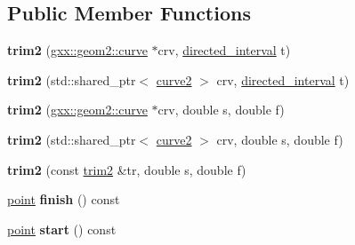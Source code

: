 \subsection*{Public Member Functions}
\begin{DoxyCompactItemize}
\item 
{\bfseries trim2} (\hyperlink{classgxx_1_1geom2_1_1curve}{gxx\+::geom2\+::curve} $\ast$crv, \hyperlink{structgxx_1_1math_1_1directed__interval}{directed\+\_\+interval} t)\hypertarget{structrabbit_1_1trim2_a51d0f1abbfbeef4913e24e9623d89c3f}{}\label{structrabbit_1_1trim2_a51d0f1abbfbeef4913e24e9623d89c3f}

\item 
{\bfseries trim2} (std\+::shared\+\_\+ptr$<$ \hyperlink{classgxx_1_1geom2_1_1curve}{curve2} $>$ crv, \hyperlink{structgxx_1_1math_1_1directed__interval}{directed\+\_\+interval} t)\hypertarget{structrabbit_1_1trim2_ae3f3a3a720ee6f72dd95f94da2bf7dd7}{}\label{structrabbit_1_1trim2_ae3f3a3a720ee6f72dd95f94da2bf7dd7}

\item 
{\bfseries trim2} (\hyperlink{classgxx_1_1geom2_1_1curve}{gxx\+::geom2\+::curve} $\ast$crv, double s, double f)\hypertarget{structrabbit_1_1trim2_afa89139dae6c5a62169c09da6bc80e47}{}\label{structrabbit_1_1trim2_afa89139dae6c5a62169c09da6bc80e47}

\item 
{\bfseries trim2} (std\+::shared\+\_\+ptr$<$ \hyperlink{classgxx_1_1geom2_1_1curve}{curve2} $>$ crv, double s, double f)\hypertarget{structrabbit_1_1trim2_a2e267fcd8611640b3be9bc1204980900}{}\label{structrabbit_1_1trim2_a2e267fcd8611640b3be9bc1204980900}

\item 
{\bfseries trim2} (const \hyperlink{structrabbit_1_1trim2}{trim2} \&tr, double s, double f)\hypertarget{structrabbit_1_1trim2_a801de15b482491ab24ab4f687e927d27}{}\label{structrabbit_1_1trim2_a801de15b482491ab24ab4f687e927d27}

\item 
\hyperlink{classmalgo_1_1vector2}{point} {\bfseries finish} () const \hypertarget{structrabbit_1_1trim2_a8a40da029d9e3b321169905806ed07c0}{}\label{structrabbit_1_1trim2_a8a40da029d9e3b321169905806ed07c0}

\item 
\hyperlink{classmalgo_1_1vector2}{point} {\bfseries start} () const \hypertarget{structrabbit_1_1trim2_af6bf701b9b1eb725c7fbdec7527dbbfc}{}\label{structrabbit_1_1trim2_af6bf701b9b1eb725c7fbdec7527dbbfc}


\end{DoxyCompactItemize}
